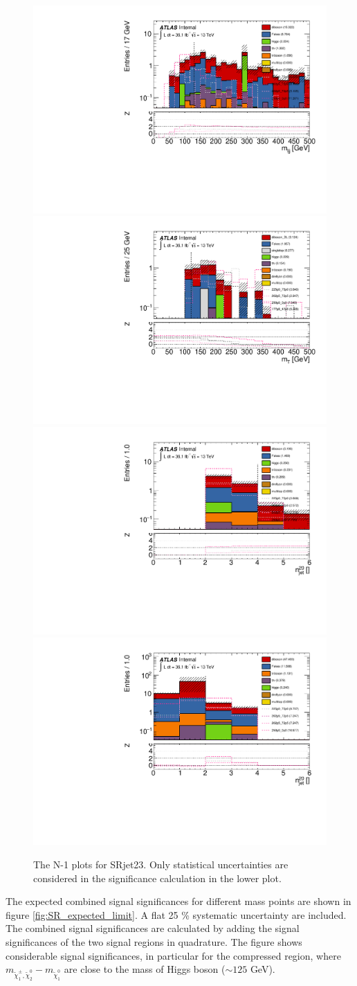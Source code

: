 \begin{figure}[htpb]
\includegraphics[width=0.45\linewidth]{data/plot/SR_redefinition/SRjet23/hmljj_comb_fakes_upd.pdf}\includegraphics[width=0.45\linewidth]{data/plot/SR_redefinition/SRjet23/lemt_fakes.pdf}\\
\includegraphics[width=0.45\linewidth]{data/plot/SR_redefinition/SRjet23/hnJet20_fakes.pdf}\includegraphics[width=0.45\linewidth]{data/plot/SR_redefinition/SRjet23/lenJet20_fakes.pdf}\\
\caption{The N-1 plots for SRjet23. Only statistical uncertainties are considered in the significance calculation in the lower plot.}
\label{fig:SRjet23_N1}
\end{figure}

The expected combined signal significances for different mass points are shown in figure \ref{fig:SR_expected_limit}.
A flat 25 \% systematic uncertainty are included.
The combined signal significances are calculated by adding the signal significances of the two signal regions in quadrature.
The figure shows considerable signal significances, in particular for the compressed region, where $m_{\tilde{\chi}_1^\pm , \tilde{\chi}_2^0} - m_{\tilde{\chi}_1^0}$ are close to the mass of Higgs boson ($\sim 125$ GeV).

